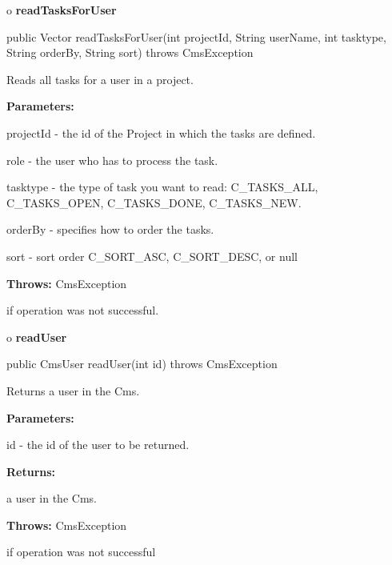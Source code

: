 o {\bf readTasksForUser} 

\begin{PRE}
 public Vector readTasksForUser(int projectId,
                                String userName,
                                int tasktype,
                                String orderBy,
                                String sort) throws CmsException
\end{PRE}

\begin{description}
\htmlDD Reads all tasks for a user in a project. 

\begin{description}
\item {\bf Parameters:}  

projectId - the id of the Project in which the tasks are defined.  

role - the user who has to process the task.  

tasktype - the type of task you want to read: C\_TASKS\_ALL, C\_TASKS\_OPEN,
C\_TASKS\_DONE, C\_TASKS\_NEW.  

orderBy - specifies how to order the tasks.  

sort - sort order C\_SORT\_ASC, C\_SORT\_DESC, or null  
\item {\bf Throws:} CmsException  

if operation was not successful.  
\end{description}

\end{description}

o {\bf readUser} 

\begin{PRE}
 public CmsUser readUser(int id) throws CmsException
\end{PRE}

\begin{description}
\htmlDD Returns a user in the Cms. 

\begin{description}
\item {\bf Parameters:}  

id - the id of the user to be returned.  
\item {\bf Returns:}  

a user in the Cms.  
\item {\bf Throws:} CmsException  

if operation was not successful  
\end{description}

\end{description}

